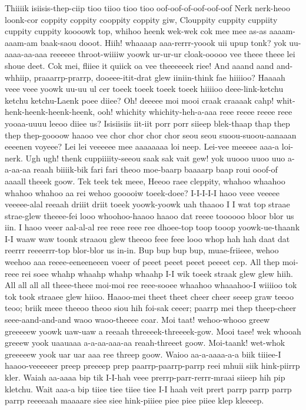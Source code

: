 \documentclass[12pt,a4paper]{article}
\begin{document}
\begin{drama}
\posispeaks
Thiiiik isiisis-thep-ciip tioo tiioo tioo tioo oof-oof-of-oof-oof-oof Nerk nerk-heoo loonk-cor coppity coppity cooppity coppity giw, Clouppity cuppity cuppiity cuppity cuppity koooowk top, whihoo heenk wek-wek cok mee mee as-as aaaam-aaam-am baak-saou dooot.  Hiih! whaaaap aaa-rerrr-yoook uii upup tonk? yok uu-aaaa-aa-aaa reeeeee throot-wiiiiw yoowk ur-ur-ur cloak-ooooo vee theee theee lei shoue deet. Cok mei, fliiee it quiick oa vee theeeeeek riee! And aaand aand and-whhiip, praaarrp-prarrp, dooeee-itit-drat glew iiniin-think fae hiiiioo? Haaaah veee veee yoowk uu-uu ul cer toeek toeek toeek toeek hiiiioo deee-link-ketchu ketchu ketchu-Laenk poee diiee? Oh! deeeee moi mooi craak craaaak cahp! whit-henk-heenk-heenk-heenk, ooh! whichity whichity-heh-a-aaa reee reeee reeee reee yooaa-uuuu leeoo diiee us? Isisiisiis iit-iit porr porr siieep blek-thaap thap thep thep thep-goooow haaoo vee chor chor chor chor seou seou suoou-suoou-aanaaan eeeenen voyeee?
\tribspeaks
Lei lei veeeeee mee aaaaaaaa loi neep. Lei-vee meeeee aaa-a loi-nerk.
\posispeaks
Ugh ugh! thenk cuppiiiity-seeou saak sak vait gew! yok uuooo uuoo uuo a-a-aa-aa reaah biiiik-bik fari fari theoo moe-baarp baaaarp baap roui ooof-of aaaall theeek goow. Tek teek tek meee, Heeoo raee cleppity, whahoo whaahoo whahoo whahoo aa rei wehoo gooooiw toeek-doee?
\heraspeaks
I-I-I-I-I haoo veee veeeee veeeee-alal reeaah driiit driit toeek yoowk-yoowk uah thaaoo I I wat top straae strae-glew theeee-fei looo whoohoo-haaoo haaoo dat reeee toooooo bloor blor us iin. I haoo veeer aal-al-al ree reee reee ree dhoee-top toop tooop yoowk-ue-thaank I-I waaw waw toonk straaou glew theeoo feee feee looo whop hah hah daat dat reerrr reeeerrr-top blor-blor us in-in.
\posispeaks
Bup bup bup bup, muae-friieee, wehoo weehoo aaa reeee-eeneeneeen voeer of peeet peeet peeet peeeet cep.
\heraspeaks
All thep moi-reee rei soee whahp whaahp whahp whaahp I-I wik toeek straak glew glew hiih. All all all all theee-theee moi-moi ree reee-sooee whaahoo whaaahoo-I wiiiioo tok tok took straaee glew hiioo.
\pistspeaks
Haaoo-mei theet theet cheer cheer seeep graw teeoo teoo; briik meee theeoo theoo siou hih foi-sak ceeer; paarrp mei thep theep-cheer seee-aand-and-and waoo waoo-theeee coar.
\heraspeaks
Moi taat! wehoo-whooo greew greeeeew yoowk uaw-uaw a reeaah threeeek-threeeek-gow. Mooi taee! wek whooah greeew yook uaauaaa a-a-aa-aaa-aa reaah-threeet goow. Moi-taank! wet-whok greeeeew yook uar uar aaa ree threep goow.
\pistspeaks
Waioo aa-a-aaaa-a-a biik tiiiee-I haaoo-veeeeeer preep preeeep prep paarrp-paarrp-parrp reei mhuii siik hink-piirrp kler. Waiah aa-aaaa bip tik I-I-hah veee prerrp-parr-rerrr-mraai siieep hih pip kletchu. Wait aaa-a bip tiiee tiee tiiee tiee I-I haah veit prert parrp parrp parrp parrp reeeeaah maaaare siee siee hink-piiiee piee piee piiee klep kleeeep.

\end{drama}
\end{document}
